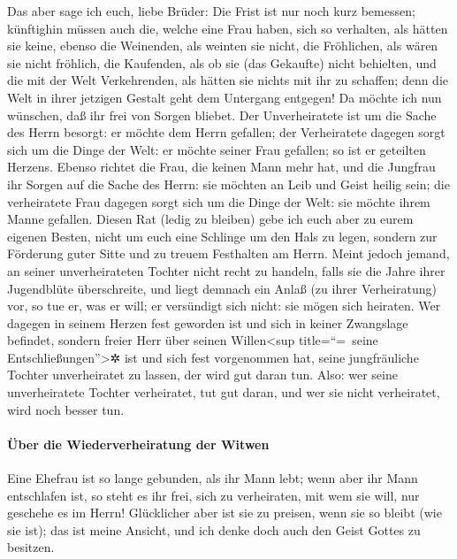  Das aber sage ich euch, liebe Brüder: Die Frist ist nur
noch kurz bemessen; künftighin müssen auch die, welche eine Frau haben,
sich so verhalten, als hätten sie keine,  ebenso die
Weinenden, als weinten sie nicht, die Fröhlichen, als wären sie nicht
fröhlich, die Kaufenden, als ob sie (das Gekaufte) nicht behielten,
 und die mit der Welt Verkehrenden, als hätten sie nichts
mit ihr zu schaffen; denn die Welt in ihrer jetzigen Gestalt geht dem
Untergang entgegen!  Da möchte ich nun wünschen, daß ihr
frei von Sorgen bliebet. Der Unverheiratete ist um die Sache des Herrn
besorgt: er möchte dem Herrn gefallen;  der Verheiratete
dagegen sorgt sich um die Dinge der Welt: er möchte seiner Frau
gefallen;  so ist er geteilten Herzens. Ebenso richtet
die Frau, die keinen Mann mehr hat, und die Jungfrau ihr Sorgen auf die
Sache des Herrn: sie möchten an Leib und Geist heilig sein; die
verheiratete Frau dagegen sorgt sich um die Dinge der Welt: sie möchte
ihrem Manne gefallen.  Diesen Rat (ledig zu bleiben) gebe
ich euch aber zu eurem eigenen Besten, nicht um euch eine Schlinge um
den Hals zu legen, sondern zur Förderung guter Sitte und zu treuem
Festhalten am Herrn.  Meint jedoch jemand, an seiner
unverheirateten Tochter nicht recht zu handeln, falls sie die Jahre
ihrer Jugendblüte überschreite, und liegt demnach ein Anlaß (zu ihrer
Verheiratung) vor, so tue er, was er will; er versündigt sich nicht: sie
mögen sich heiraten.  Wer dagegen in seinem Herzen fest
geworden ist und sich in keiner Zwangslage befindet, sondern freier Herr
über seinen Willen\textless sup title=``=~seine
Entschließungen''\textgreater✲ ist und sich fest vorgenommen hat, seine
jungfräuliche Tochter unverheiratet zu lassen, der wird gut daran tun.
 Also: wer seine unverheiratete Tochter verheiratet, tut
gut daran, und wer sie nicht verheiratet, wird noch besser tun.

\hypertarget{uxfcber-die-wiederverheiratung-der-witwen}{%
\paragraph{Über die Wiederverheiratung der
Witwen}\label{uxfcber-die-wiederverheiratung-der-witwen}}

 Eine Ehefrau ist so lange gebunden, als ihr Mann lebt;
wenn aber ihr Mann entschlafen ist, so steht es ihr frei, sich zu
verheiraten, mit wem sie will, nur geschehe es im Herrn! 
Glücklicher aber ist sie zu preisen, wenn sie so bleibt (wie sie ist);
das ist meine Ansicht, und ich denke doch auch den Geist Gottes zu
besitzen.

